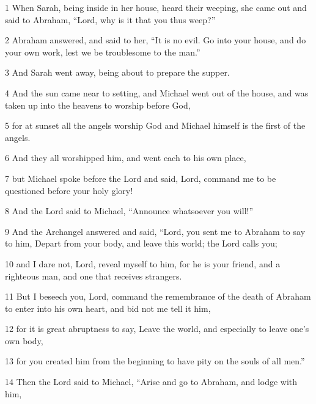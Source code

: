 \par 1 When Sarah, being inside in her house, heard their weeping, she came out and said to Abraham, “Lord, why is it that you thus weep?” 

\par 2 Abraham answered, and said to her, “It is no evil. Go into your house, and do your own work, lest we be troublesome to the man.” 

\par 3 And Sarah went away, being about to prepare the supper. 

\par 4 And the sun came near to setting, and Michael went out of the house, and was taken up into the heavens to worship before God, 

\par 5 for at sunset all the angels worship God and Michael himself is the first of the angels. 

\par 6 And they all worshipped him, and went each to his own place, 

\par 7 but Michael spoke before the Lord and said, Lord, command me to be questioned before your holy glory! 

\par 8 And the Lord said to Michael, “Announce whatsoever you will!” 

\par 9 And the Archangel answered and said, “Lord, you sent me to Abraham to say to him, Depart from your body, and leave this world; the Lord calls you; 

\par 10 and I dare not, Lord, reveal myself to him, for he is your friend, and a righteous man, and one that receives strangers. 

\par 11 But I beseech you, Lord, command the remembrance of the death of Abraham to enter into his own heart, and bid not me tell it him, 

\par 12 for it is great abruptness to say, Leave the world, and especially to leave one's own body, 

\par 13 for you created him from the beginning to have pity on the souls of all men.” 

\par 14 Then the Lord said to Michael, “Arise and go to Abraham, and lodge with him, 


